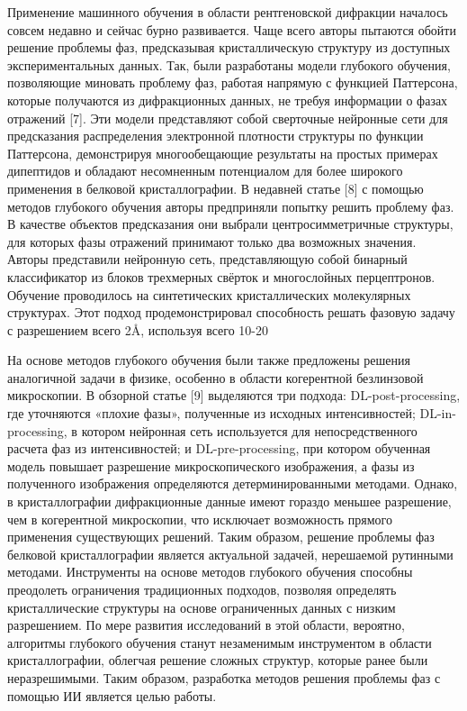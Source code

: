 Применение машинного обучения в области рентгеновской дифракции началось совсем недавно и сейчас бурно развивается. Чаще всего авторы пытаются обойти решение проблемы фаз, предсказывая кристаллическую структуру из доступных экспериментальных данных. Так, были разработаны модели глубокого обучения, позволяющие миновать проблему фаз, работая напрямую с функцией Паттерсона, которые получаются из дифракционных данных, не требуя информации о фазах отражений [7]. Эти модели представляют собой сверточные нейронные сети для предсказания распределения электронной плотности структуры по функции Паттерсона, демонстрируя многообещающие результаты на простых примерах дипептидов и обладают несомненным потенциалом для более широкого применения в белковой кристаллографии.
В недавней статье [8] с помощью методов глубокого обучения авторы предприняли попытку решить проблему фаз. В качестве объектов предсказания они выбрали центросимметричные структуры, для которых фазы отражений принимают только два возможных значения. Авторы представили нейронную сеть, представляющую собой бинарный классификатор из блоков трехмерных свёрток и многослойных перцептронов. Обучение проводилось на синтетических кристаллических молекулярных структурах. Этот подход продемонстрировал способность решать фазовую задачу с разрешением всего 2Å, используя всего 10-20%

На основе методов глубокого обучения были также предложены решения аналогичной задачи в физике, особенно в области когерентной безлинзовой микроскопии. В обзорной статье [9] выделяются три подхода: DL-post-processing, где уточняются «плохие фазы», полученные из исходных интенсивностей; DL-in-processing, в котором нейронная сеть используется для непосредственного расчета фаз из интенсивностей; и DL-pre-processing, при котором обученная модель повышает разрешение микроскопического изображения, а фазы из полученного изображения определяются детерминированными методами. Однако, в кристаллографии дифракционные данные имеют гораздо меньшее разрешение, чем в когерентной микроскопии, что исключает возможность прямого применения существующих решений.
Таким образом, решение проблемы фаз белковой кристаллографии является актуальной задачей, нерешаемой рутинными методами. Инструменты на основе методов глубокого обучения способны преодолеть ограничения традиционных подходов, позволяя определять кристаллические структуры на основе ограниченных данных с низким разрешением. По мере развития исследований в этой области, вероятно, алгоритмы глубокого обучения станут незаменимым инструментом в области кристаллографии, облегчая решение сложных структур, которые ранее были неразрешимыми. Таким образом, разработка методов решения проблемы фаз с помощью ИИ является целью работы.